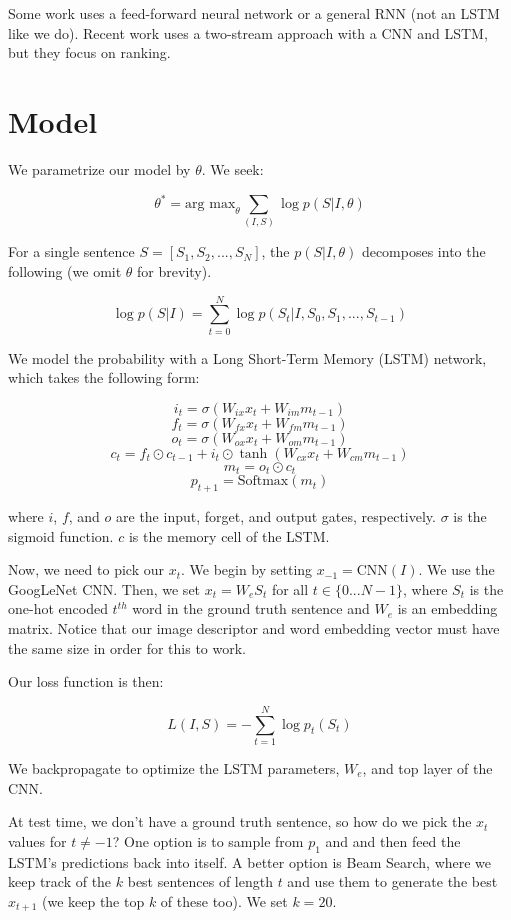 \documentclass[a4paper]{article}
\begin{document}
Some work uses a feed-forward neural network or a general RNN (not an LSTM like
we do). Recent work uses a two-stream approach with a CNN and LSTM, but they
focus on ranking.

\section{Model}
We parametrize our model by $\theta$. We seek:

$$
\theta^* = \textrm{arg max}_{\theta}{\sum_{(I, S)}{\log p(S | I, \theta)}}
$$

For a single sentence $S = [S_1, S_2, ..., S_N]$, the $p(S|I, \theta)$
decomposes into the following (we omit $\theta$ for brevity).

$$
\log p(S|I) = \sum_{t=0}^{N}{\log p(S_t|I, S_0, S_1, ..., S_{t-1})}
$$

We model the probability with a Long Short-Term Memory (LSTM) network, which
takes the following form:

$$
i_t = \sigma(W_{ix} x_t + W_{im} m_{t-1})
$$
$$
f_t = \sigma(W_{fx} x_t + W_{fm} m_{t-1})
$$
$$
o_t = \sigma(W_{ox} x_t + W_{om} m_{t-1})
$$
$$
c_t = f_t \odot c_{t-1} + i_t \odot \tanh(W_{cx} x_t + W_{cm} m_{t-1})
$$
$$
m_t = o_t \odot c_t
$$
$$
p_{t+1} = \textrm{Softmax}(m_t)
$$

where $i$, $f$, and $o$ are the input, forget, and output gates, respectively.
$\sigma$ is the sigmoid function. $c$ is the memory cell of the LSTM.

Now, we need to pick our $x_t$. We begin by setting $x_{-1} = \textrm{CNN}(I)$.
We use the GoogLeNet CNN. Then, we set $x_t = W_e S_t$ for all $t \in
\{0...N-1\}$, where $S_t$ is the one-hot encoded $t^{th}$ word in the ground
truth sentence and $W_e$ is an embedding matrix. Notice that our image
descriptor and word embedding vector must have the same size in order for
this to work.

Our loss function is then:

$$
L(I, S) = - \sum_{t=1}^{N}{\log p_t(S_t)}
$$

We backpropagate to optimize the LSTM parameters, $W_e$, and top layer of the
CNN.

At test time, we don't have a ground truth sentence, so how do we pick the
$x_t$ values for $t \ne -1$? One option is to sample from $p_1$ and and then
feed the LSTM's predictions back into itself. A better option is Beam Search,
where we keep track of the $k$ best sentences of length $t$ and use them
to generate the best $x_{t+1}$ (we keep the top $k$ of these too). We set
$k = 20$.
\end{document}
